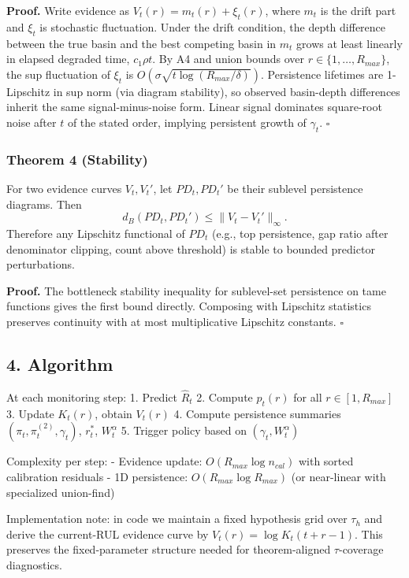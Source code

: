 \documentclass[
]{article}
\begin{document}
\textbf{Proof.} Write evidence as \(V_t(r)=m_t(r)+\xi_t(r)\), where
\(m_t\) is the drift part and \(\xi_t\) is stochastic fluctuation. Under
the drift condition, the depth difference between the true basin and the
best competing basin in \(m_t\) grows at least linearly in elapsed
degraded time, \(c_1\rho t\). By A4 and union bounds over
\(r\in\{1,\dots,R_{max}\}\), the sup fluctuation of \(\xi_t\) is
\(O(\sigma\sqrt{t\log(R_{max}/\delta)})\). Persistence lifetimes are
1-Lipschitz in sup norm (via diagram stability), so observed basin-depth
differences inherit the same signal-minus-noise form. Linear signal
dominates square-root noise after \(t\) of the stated order, implying
persistent growth of \(\gamma_t\). \(\square\)

\subsubsection{Theorem 4 (Stability)}\label{theorem-4-stability}

For two evidence curves \(V_t,V_t'\), let \(PD_t,PD_t'\) be their
sublevel persistence diagrams. Then \[
d_B(PD_t,PD_t')\le \|V_t-V_t'\|_\infty.
\] Therefore any Lipschitz functional of \(PD_t\) (e.g., top
persistence, gap ratio after denominator clipping, count above
threshold) is stable to bounded predictor perturbations.

\textbf{Proof.} The bottleneck stability inequality for sublevel-set
persistence on tame functions gives the first bound directly. Composing
with Lipschitz statistics preserves continuity with at most
multiplicative Lipschitz constants. \(\square\)

\subsection{4. Algorithm}\label{algorithm}

At each monitoring step: 1. Predict \(\hat R_t\) 2. Compute \(p_t(r)\)
for all \(r\in[1,R_{max}]\) 3. Update \(K_t(r)\), obtain \(V_t(r)\) 4.
Compute persistence summaries \((\pi_t,\pi_t^{(2)},\gamma_t)\),
\(r_t^*\), \(W_t^\alpha\) 5. Trigger policy based on
\((\gamma_t,W_t^\alpha)\)

Complexity per step: - Evidence update: \(O(R_{max}\log n_{cal})\) with
sorted calibration residuals - 1D persistence:
\(O(R_{max}\log R_{max})\) (or near-linear with specialized union-find)

Implementation note: in code we maintain a fixed hypothesis grid over
\(\tau_h\) and derive the current-RUL evidence curve by
\(V_t(r)=\log K_t(t+r-1)\). This preserves the fixed-parameter structure
needed for theorem-aligned \(\tau\)-coverage diagnostics.
\end{document}
